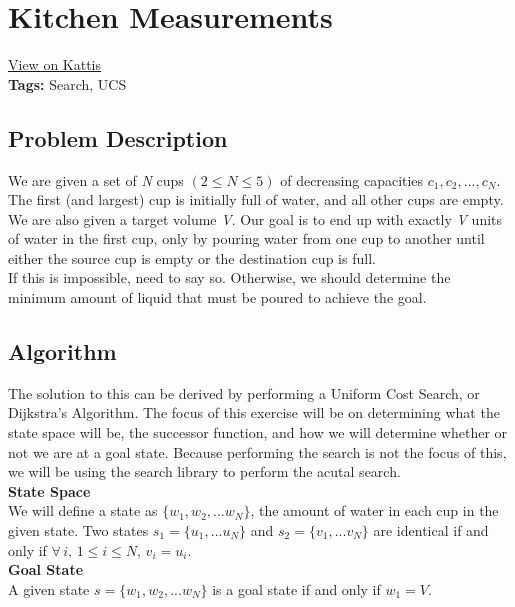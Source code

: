 \section{Kitchen Measurements}
\label{kitchenmeasurements}
\href{https://open.kattis.com/problems/kitchen}{View on Kattis}\\
\textbf{Tags:} Search, UCS\\
\subsection{Problem Description}

We are given a set of \textit{N} cups $(2 \leq N \leq 5)$ of decreasing
capacities $c_{1}, c_{2}, ..., c_{N}$. The first (and largest) cup is initially
full of water, and all other cups are empty. We are also given a target volume
\textit{V}. Our goal is to end up with exactly \textit{V} units of water in the
first cup, only by pouring water from one cup to another until either the source
cup is empty or the destination cup is full.\\
\hfill\break
If this is impossible, need to say so. Otherwise, we should determine the
minimum amount of liquid that must be poured to achieve the goal.
\subsection{Algorithm}

The solution to this can be derived by performing a Uniform Cost Search, or
Dijkstra's Algorithm. The focus of this exercise will be on determining what
the state space will be, the successor function, and how we will determine
whether or not we are at a goal state. Because performing the search is not the
focus of this, we will be using the search library to perform the acutal search.\\

\textbf{State Space}\\
We will define a state as $\{w_{1}, w_{2}, ... w_{N}\}$, the amount of water in each
cup in the given state. Two states $s_{1} = \{u_{1}, ... u_{N}\}$ and
$s_{2} = \{v_{1}, ... v_{N}\}$ are identical if and only if
$\forall\, i,\, 1 \leq i \leq N,\, v_{i} = u_{i}$.\\

\textbf{Goal State}\\
A given state $s = \{w_{1}, w_{2}, ... w_{N}\}$ is a goal state if and only if
$w_{1} = V$.\\

